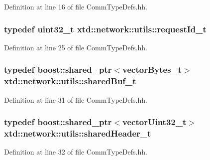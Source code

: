 Definition at line 16 of file Comm\+Type\+Defs.\+hh.

\subsubsection[{\texorpdfstring{request\+Id\+\_\+t}{requestId_t}}]{\setlength{\rightskip}{0pt plus 5cm}typedef uint32\+\_\+t {\bf xtd\+::network\+::utils\+::request\+Id\+\_\+t}}\hypertarget{namespacextd_1_1network_1_1utils_a0bdb4094852a77df867e219999175200}{}\label{namespacextd_1_1network_1_1utils_a0bdb4094852a77df867e219999175200}


Definition at line 25 of file Comm\+Type\+Defs.\+hh.

\subsubsection[{\texorpdfstring{shared\+Buf\+\_\+t}{sharedBuf_t}}]{\setlength{\rightskip}{0pt plus 5cm}typedef boost\+::shared\+\_\+ptr$<${\bf vector\+Bytes\+\_\+t}$>$ {\bf xtd\+::network\+::utils\+::shared\+Buf\+\_\+t}}\hypertarget{namespacextd_1_1network_1_1utils_a92b366b7e2a1ab09ac4f4a0401f8fb84}{}\label{namespacextd_1_1network_1_1utils_a92b366b7e2a1ab09ac4f4a0401f8fb84}


Definition at line 31 of file Comm\+Type\+Defs.\+hh.

\subsubsection[{\texorpdfstring{shared\+Header\+\_\+t}{sharedHeader_t}}]{\setlength{\rightskip}{0pt plus 5cm}typedef boost\+::shared\+\_\+ptr$<${\bf vector\+Uint32\+\_\+t}$>$ {\bf xtd\+::network\+::utils\+::shared\+Header\+\_\+t}}\hypertarget{namespacextd_1_1network_1_1utils_af5b287652a0fd8fca54642f8d3ca07fa}{}\label{namespacextd_1_1network_1_1utils_af5b287652a0fd8fca54642f8d3ca07fa}


Definition at line 32 of file Comm\+Type\+Defs.\+hh.

